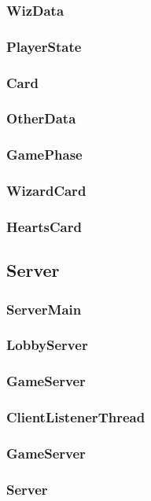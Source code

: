 \documentclass{article}
\begin{document}
\subsubsection{WizData}
\subsubsection{PlayerState}
\subsubsection{Card}
\subsubsection{OtherData}
\subsubsection{GamePhase}
\subsubsection{WizardCard}
\subsubsection{HeartsCard}
\newpage

\subsection{Server}
\subsubsection{ServerMain}
\subsubsection{LobbyServer}
\subsubsection{GameServer}
\subsubsection{ClientListenerThread}
\subsubsection{GameServer}
\subsubsection{Server}
\end{document}
